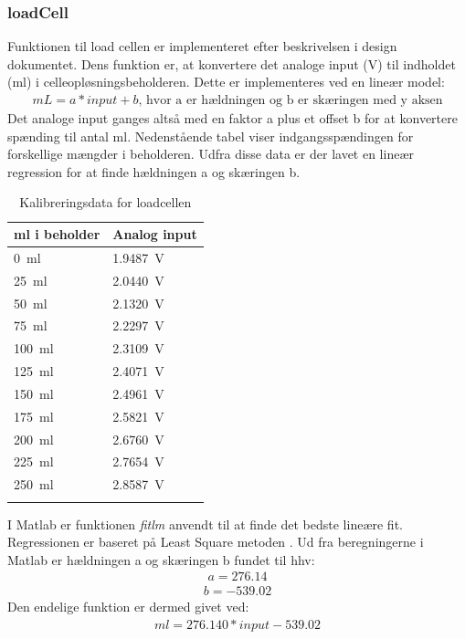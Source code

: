\subsubsection{loadCell}
\label{subsub:softwareloadcell}
Funktionen til load cellen er implementeret efter beskrivelsen i design dokumentet. Dens funktion er, at konvertere det analoge input (V) til indholdet (ml) i celleopløsningsbeholderen. Dette er implementeres ved en lineær model:
\begin{align}
mL = a*input+b \text{, hvor a er hældningen og b er skæringen med y aksen}
\end{align}
Det analoge input ganges altså med en faktor a plus et offset b for at konvertere spænding til antal ml. Nedenstående tabel viser indgangsspændingen for forskellige mængder i beholderen. Udfra disse data er der lavet en lineær regression for at finde hældningen a og skæringen b.
\begin{center}
		\begin{longtable}{ | m{3cm} | m{3cm}| } 
			\hline
			\textbf{ml i beholder} &\textbf{Analog input} \\ 
			\hline
			 \SI{0}{\milli\litre} & \SI{1.9487}{\volt} \\ 
			\hline
			 \SI{25}{\milli\litre} & \SI{2.0440}{\volt} \\ 
			\hline
			\SI{50}{\milli\litre} & \SI{2.1320}{\volt} \\ 
			\hline
			\SI{75}{\milli\litre} & \SI{2.2297}{\volt} \\ 
			\hline
			\SI{100}{\milli\litre} & \SI{2.3109}{\volt} \\ 
			\hline
			\SI{125}{\milli\litre} & \SI{2.4071}{\volt} \\ 
			\hline
			\SI{150}{\milli\litre} & \SI{2.4961}{\volt} \\ 
			\hline
			\SI{175}{\milli\litre} & \SI{2.5821}{\volt} \\ 
			\hline
			\SI{200}{\milli\litre} & \SI{2.6760}{\volt} \\ 
			\hline
			\SI{225}{\milli\litre} & \SI{2.7654}{\volt} \\ 
			\hline
			\SI{250}{\milli\litre} & \SI{2.8587}{\volt} \\ 
			\hline
			\caption{Kalibreringsdata for loadcellen}
			 		\end{longtable}
\end{center}

I Matlab er funktionen \textit{fitlm} anvendt til at finde det bedste lineære fit. Regressionen er baseret på Least Square metoden \citep{least}.
Ud fra beregningerne i Matlab er hældningen a og skæringen b fundet til hhv:
\begin{align}
a = 276.14
\end{align}
\begin{align}
b = -539.02
\end{align}
Den endelige funktion er dermed givet ved:
\begin{align}
ml = 276.140*input-539.02
\end{align}

